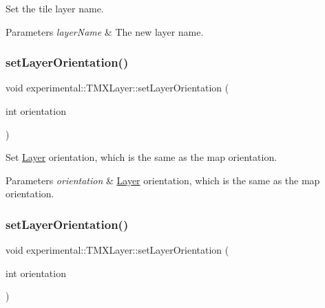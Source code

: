 Set the tile layer name.


\begin{DoxyParams}{Parameters}
{\em layer\+Name} & The new layer name. \\
\hline
\end{DoxyParams}
\mbox{\label{classexperimental_1_1TMXLayer_a0e2f58373e1e1124e7cb685ba57b6b20}} 
\subsubsection{\texorpdfstring{set\+Layer\+Orientation()}{setLayerOrientation()}\hspace{0.1cm}{\footnotesize\ttfamily [1/2]}}
{\footnotesize\ttfamily void experimental\+::\+T\+M\+X\+Layer\+::set\+Layer\+Orientation (\begin{DoxyParamCaption}\item[{int}]{orientation }\end{DoxyParamCaption})\hspace{0.3cm}{\ttfamily [inline]}}

Set \hyperlink{classLayer}{Layer} orientation, which is the same as the map orientation.


\begin{DoxyParams}{Parameters}
{\em orientation} & \hyperlink{classLayer}{Layer} orientation, which is the same as the map orientation. \\
\hline
\end{DoxyParams}
\mbox{\label{classexperimental_1_1TMXLayer_a0e2f58373e1e1124e7cb685ba57b6b20}} 
\subsubsection{\texorpdfstring{set\+Layer\+Orientation()}{setLayerOrientation()}\hspace{0.1cm}{\footnotesize\ttfamily [2/2]}}
{\footnotesize\ttfamily void experimental\+::\+T\+M\+X\+Layer\+::set\+Layer\+Orientation (\begin{DoxyParamCaption}\item[{int}]{orientation }\end{DoxyParamCaption})\hspace{0.3cm}{\ttfamily [inline]}}

